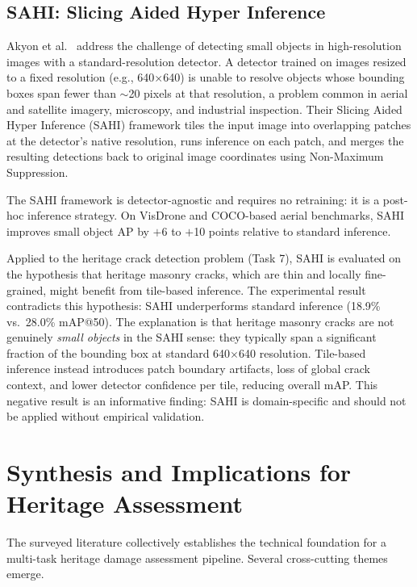 \documentclass[12pt,a4paper]{article}
\begin{document}
\subsection{SAHI: Slicing Aided Hyper Inference}

Akyon et al.~\cite{akyon2022sahi} address the challenge of detecting small objects in high-resolution images with a standard-resolution detector. A detector trained on images resized to a fixed resolution (e.g., 640$\times$640) is unable to resolve objects whose bounding boxes span fewer than $\sim$20 pixels at that resolution, a problem common in aerial and satellite imagery, microscopy, and industrial inspection. Their Slicing Aided Hyper Inference (SAHI) framework tiles the input image into overlapping patches at the detector's native resolution, runs inference on each patch, and merges the resulting detections back to original image coordinates using Non-Maximum Suppression.

The SAHI framework is detector-agnostic and requires no retraining: it is a post-hoc inference strategy. On VisDrone and COCO-based aerial benchmarks, SAHI improves small object AP by $+$6 to $+$10 points relative to standard inference.

Applied to the heritage crack detection problem (Task 7), SAHI is evaluated on the hypothesis that heritage masonry cracks, which are thin and locally fine-grained, might benefit from tile-based inference. The experimental result contradicts this hypothesis: SAHI underperforms standard inference (18.9\% vs.\ 28.0\% mAP@50). The explanation is that heritage masonry cracks are not genuinely \textit{small objects} in the SAHI sense: they typically span a significant fraction of the bounding box at standard 640$\times$640 resolution. Tile-based inference instead introduces patch boundary artifacts, loss of global crack context, and lower detector confidence per tile, reducing overall mAP. This negative result is an informative finding: SAHI is domain-specific and should not be applied without empirical validation.

\section{Synthesis and Implications for Heritage Assessment}
\label{sec:synthesis}

The surveyed literature collectively establishes the technical foundation for a multi-task heritage damage assessment pipeline. Several cross-cutting themes emerge.
\end{document}

